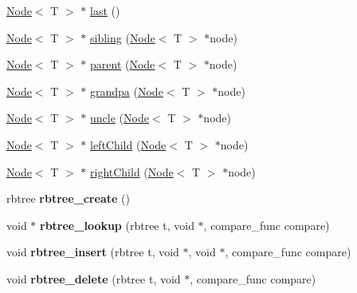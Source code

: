 \begin{DoxyCompactItemize}
\item 
\hyperlink{class_node}{Node}$<$ T $>$ $\ast$ \hyperlink{class_r_b_tree_a9ec1524fd304ab708864f3ed5929fde4}{last} ()
\item 
\hyperlink{class_node}{Node}$<$ T $>$ $\ast$ \hyperlink{class_r_b_tree_abd85da46c4bb99c2e2f0086b71990e86}{sibling} (\hyperlink{class_node}{Node}$<$ T $>$ $\ast$node)
\item 
\hyperlink{class_node}{Node}$<$ T $>$ $\ast$ \hyperlink{class_r_b_tree_a0600be3a5c7d75359a63c8d19dc175ed}{parent} (\hyperlink{class_node}{Node}$<$ T $>$ $\ast$node)
\item 
\hyperlink{class_node}{Node}$<$ T $>$ $\ast$ \hyperlink{class_r_b_tree_abb9bd44c3ad32f37f072ae19f3183d8b}{grandpa} (\hyperlink{class_node}{Node}$<$ T $>$ $\ast$node)
\item 
\hyperlink{class_node}{Node}$<$ T $>$ $\ast$ \hyperlink{class_r_b_tree_afad4eef004c3b4ed37fe1ee89f95da54}{uncle} (\hyperlink{class_node}{Node}$<$ T $>$ $\ast$node)
\item 
\hyperlink{class_node}{Node}$<$ T $>$ $\ast$ \hyperlink{class_r_b_tree_aaf6d97fec88a9168eaad604a2ae12efe}{left\+Child} (\hyperlink{class_node}{Node}$<$ T $>$ $\ast$node)
\item 
\hyperlink{class_node}{Node}$<$ T $>$ $\ast$ \hyperlink{class_r_b_tree_a1dfb71e17e463bf14a112698242c7490}{right\+Child} (\hyperlink{class_node}{Node}$<$ T $>$ $\ast$node)
\item 
\hypertarget{class_r_b_tree_a3042bec64785fe28625ba45f9b815dee}{}rbtree {\bfseries rbtree\+\_\+create} ()\label{class_r_b_tree_a3042bec64785fe28625ba45f9b815dee}

\item 
\hypertarget{class_r_b_tree_a6982a1645674e8c58cac85bcf384e3a9}{}void $\ast$ {\bfseries rbtree\+\_\+lookup} (rbtree t, void $\ast$, compare\+\_\+func compare)\label{class_r_b_tree_a6982a1645674e8c58cac85bcf384e3a9}

\item 
\hypertarget{class_r_b_tree_acce8786d0f22883e5a7cf1d340bd9b22}{}void {\bfseries rbtree\+\_\+insert} (rbtree t, void $\ast$, void $\ast$, compare\+\_\+func compare)\label{class_r_b_tree_acce8786d0f22883e5a7cf1d340bd9b22}

\item 
\hypertarget{class_r_b_tree_af1f91e826a6e8ee11a3becd4934a9374}{}void {\bfseries rbtree\+\_\+delete} (rbtree t, void $\ast$, compare\+\_\+func compare)\label{class_r_b_tree_af1f91e826a6e8ee11a3becd4934a9374}


\end{DoxyCompactItemize}
